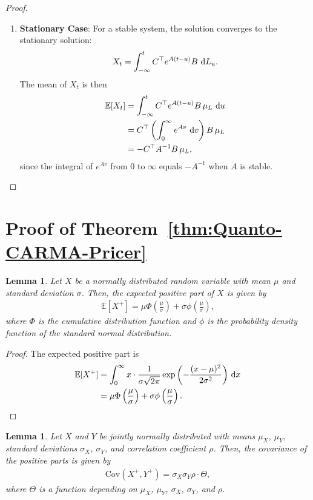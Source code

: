 \documentclass[10pt,a4paper,reqno]{amsart}
\newtheorem{lemma}[theorem]{Lemma}
\theoremstyle{example}
\newcommand{\Cov}{\mathrm{Cov}}
\newcommand*\D{\mathop{}\!\textnormal{d}}
\begin{document}
\begin{proof}
\begin{enumerate}
    \item \textbf{Stationary Case}: For a stable system, the solution converges to the stationary solution:
    \begin{align*}
    X_t = \int_{-\infty}^t C^\top e^{A (t - u)} B \, \D L_u.
    \end{align*}
    The mean of $X_t$ is then
    \begin{align*}
    \mathbb{E}[ X_t ] &= \int_{-\infty}^t C^\top e^{A (t - u)} B \, \mu_L \, \D u \\
    &= C^\top \left( \int_0^\infty e^{A v} \, \D v \right) B \, \mu_L \\
    &= - C^\top A^{-1} B \, \mu_L,
    \end{align*}
    since the integral of $e^{A v}$ from $0$ to $\infty$ equals $-A^{-1}$ when
    $A$ is stable. 
\end{enumerate}
\end{proof}



\section{Proof of
  Theorem~\ref{thm:Quanto-CARMA-Pricer}}\label{sec:proof-Quanto-CARMA-Pricer}

\begin{lemma}\label{lem:normal-distribution-positive}
Let $X$ be a normally distributed random variable with mean $\mu$ and standard deviation $\sigma$. Then, the expected positive part of $X$ is given by
\begin{align}
    \mathbb{E}[ X^+ ] = \mu \Phi\left( \frac{\mu}{\sigma} \right) + \sigma \phi\left( \frac{\mu}{\sigma} \right),
\end{align}
where $\Phi$ is the cumulative distribution function and $\phi$ is the probability density function of the standard normal distribution.
\end{lemma}

\begin{proof}
The expected positive part is
\begin{align}
    \mathbb{E}[ X^+ ] &= \int_0^\infty x \cdot \frac{1}{\sigma \sqrt{2\pi}} \exp\left( -\frac{(x - \mu)^2}{2\sigma^2} \right) \, \D x \\
    &= \mu \Phi\left( \frac{\mu}{\sigma} \right) + \sigma \phi\left( \frac{\mu}{\sigma} \right).
\end{align}
\end{proof}

\begin{lemma}
Let $X$ and $Y$ be jointly normally distributed with means $\mu_X$, $\mu_Y$, standard deviations $\sigma_X$, $\sigma_Y$, and correlation coefficient $\rho$. Then, the covariance of the positive parts is given by
\begin{align}
    \Cov\left( X^+, Y^+ \right) = \sigma_X \sigma_Y \rho \cdot \Theta,
\end{align}
where $\Theta$ is a function depending on $\mu_X$, $\mu_Y$, $\sigma_X$, $\sigma_Y$, and $\rho$.
\end{lemma}
\end{document}
